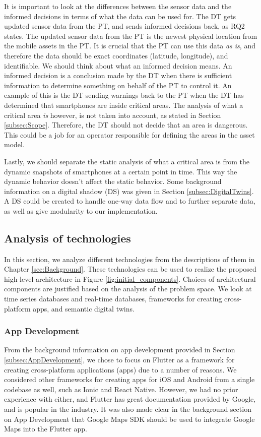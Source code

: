 \documentclass{article}
\begin{document}
It is important to look at the differences between the sensor data and the informed decisions in terms of what the data can be used for. The DT gets updated sensor data from the PT, and sends informed decisions back, as RQ2 states. The updated sensor data from the PT is the newest physical location from the mobile assets in the PT. It is crucial that the PT can use this data \emph{as is}, and therefore the data should be exact coordinates (latitude, longitude), and identifiable. We should think about what an informed decision means. An informed decision is a conclusion made by the DT when there is sufficient information to determine something on behalf of the PT to control it. An example of this is the DT sending warnings back to the PT when the DT has determined that smartphones are inside critical areas. The analysis of what a critical area \emph{is} however, is not taken into account, as stated in Section \ref{subsec:Scope}. Therefore, the DT should not decide that an area is dangerous. This could be a job for an operator responsible for defining the areas in the asset model. 

Lastly, we should separate the static analysis of what a critical area is from the dynamic snapshots of smartphones at a certain point in time. This way the dynamic behavior doesn't affect the static behavior. Some background information on a digital shadow (DS) was given in Section \ref{subsec:DigitalTwins}. A DS could be created to handle one-way data flow and to further separate data, as well as give modularity to our implementation.

\subsection{Analysis of technologies}
In this section, we analyze different technologies from the descriptions of them in Chapter \ref{sec:Background}. These technologies can be used to realize the proposed high-level architecture in Figure \ref{fig:initial_components}. Choices of architectural components are justified based on the analysis of the problem space. We look at time series databases and real-time databases, frameworks for creating cross-platform apps, and semantic digital twins.

\subsubsection{App Development}\label{subsubsection:AppDevelopment}
From the background information on app development provided in Section \ref{subsec:AppDevelopment}, we chose to focus on Flutter as a framework for creating cross-platform applications (apps) due to a number of reasons. We considered other frameworks for creating apps for iOS and Android from a single codebase as well, such as Ionic and React Native. However, we had no prior experience with either, and Flutter has great documentation provided by Google, and is popular in the industry. It was also made clear in the background section on App Development that Google Maps SDK should be used to integrate Google Maps into the Flutter app.
\end{document}
